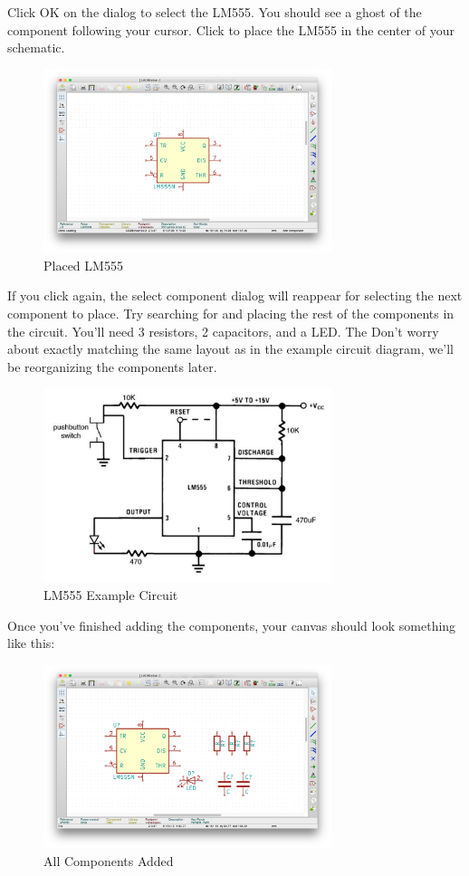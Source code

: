 \documentclass[12pt, oneside]{article}
\begin{document}
Click OK on the dialog to select the LM555. You should see a ghost of the component following your cursor. Click to place the LM555 in the center of your schematic.

\begin{figure}[H]
\includegraphics[width=0.75\textwidth]{PlacedLM555}
\centering
\caption{Placed LM555}
\end{figure}

If you click again, the select component dialog will reappear for selecting the next component to place. Try searching for and placing the rest of the components in the circuit. You'll need 3 resistors, 2 capacitors, and a LED. The Don't worry about exactly matching the same layout as in the example circuit diagram, we'll be reorganizing the components later.

\begin{figure}[H]
\includegraphics[width=0.75\textwidth]{DatasheetSchematic}
\centering
\caption{LM555 Example Circuit}
\end{figure}

Once you've finished adding the components, your canvas should look something like this:

\begin{figure}[H]
\includegraphics[width=0.75\textwidth]{AddedComponents}
\centering
\caption{All Components Added}
\end{figure}
\end{document}
